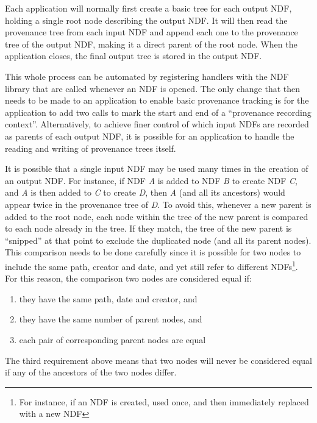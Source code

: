 \documentclass[final,authoryear,5p,times,twocolumn]{elsarticle}
\begin{document}
Each application will normally first create a basic tree for each output
NDF, holding a single root node describing the output NDF. It will then
read the provenance tree from each input NDF and append each one to the
provenance tree of the output NDF, making it a direct parent of the root
node. When the application closes, the final output tree is stored in
the output NDF.

This whole process can be automated by registering handlers with the NDF
library that are called whenever an NDF is opened. The only change that
then needs to be made to an application to enable basic provenance tracking is for the
application to add two calls to mark the start and end of a ``provenance
recording context''. Alternatively, to achieve finer control of which
input NDFs are recorded as parents of each output NDF, it is possible for
an application to handle the reading and writing of provenance trees
itself.

It is possible that a single input NDF may be used many times in the
creation of an output NDF. For instance, if NDF \emph{A} is added to NDF
\emph{B} to create NDF \emph{C}, and \emph{A} is then added to \emph{C} to create
\emph{D}, then \emph{A} (and all its ancestors) would appear twice in the
provenance tree of \emph{D}. To avoid this, whenever a new parent is added to
the root node, each node within the tree of the new parent is compared to
each node already in the tree. If they match, the tree of the new parent
is ``snipped'' at that point to exclude the duplicated node (and all its
parent nodes). This comparison needs to be done carefully since it is
possible for two nodes to include the same path, creator and date, and
yet still refer to different NDFs\footnote{For instance, if an NDF is
created, used once, and then immediately replaced with a new NDF}. For
this reason, the comparison two nodes are considered equal if:

\begin{enumerate}
\item they have the same path, date and creator, and
\item they have the same number of parent nodes, and
\item each pair of corresponding parent nodes are equal
\end{enumerate}

The third requirement above means that two nodes will never be considered
equal if any of the ancestors of the two nodes differ.
\end{document}

